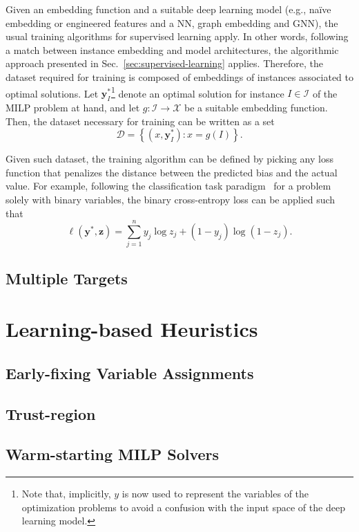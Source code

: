 Given an embedding function and a suitable deep learning model (e.g., naïve embedding or engineered features and a NN, graph embedding and GNN), the usual training algorithms for supervised learning apply.
In other words, following a match between instance embedding and model architectures, the algorithmic approach presented in Sec.~\ref{sec:supervised-learning} applies.
Therefore, the dataset required for training is composed of embeddings of instances associated to optimal solutions.
Let $\bm{y}^{*}_I$\footnote{Note that, implicitly, $y$ is now used to represent the variables of the optimization problems to avoid a confusion with the input space of the deep learning model.} denote an optimal solution for instance $I\in \mathcal{I}$ of the MILP problem at hand, and let $g: \mathcal{I} \longrightarrow \mathcal{X}$ be a suitable embedding function.
Then, the dataset necessary for training can be written as a set \[
    \mathcal{D} = \left\{ (x, \bm{y}^{*}_I) : x = g(I) \right\} 
.\] 

Given such dataset, the training algorithm can be defined by picking any loss function that penalizes the distance between the predicted bias and the actual value.
For example, following the classification task paradigm~\cite{goodfellowQualitativelyCharacterizingNeural2015} for a problem solely with binary variables, the binary cross-entropy loss can be applied such that
\begin{equation}
    \ell(\bm{y}^*, \bm{z}) = \sum_{j=1}^{n} y_j \log z_j + (1-y_j) \log (1 - z_j)
.\end{equation}

\subsection{Multiple Targets}

\section{Learning-based Heuristics}\label{sec:learning-based-heuristics}

\subsection{Early-fixing Variable Assignments}

\subsection{Trust-region}

\subsection{Warm-starting MILP Solvers}

